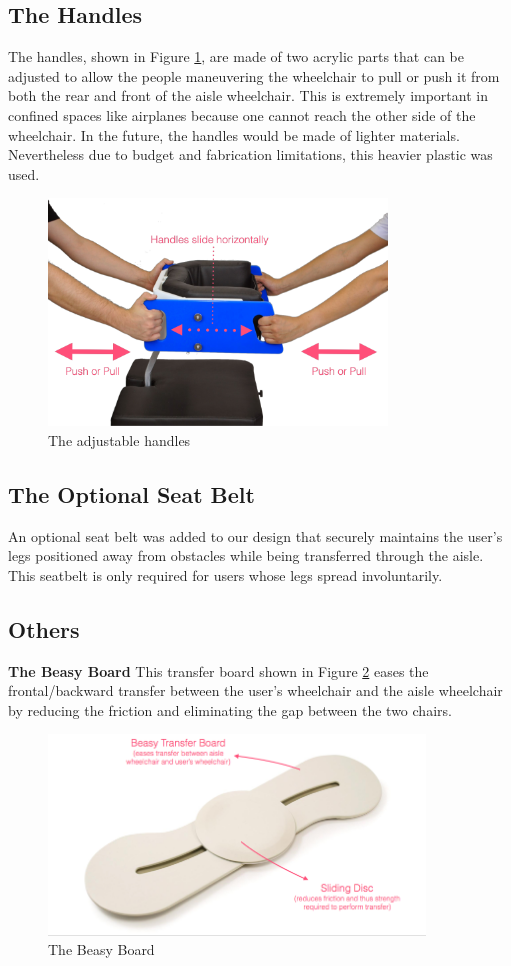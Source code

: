 \subsection{The Handles}
The handles, shown in Figure \ref{fig:handles}, are made of two acrylic parts that can be adjusted to allow the people maneuvering the wheelchair to pull or push it from both the rear and front of the aisle wheelchair. This is extremely important in confined spaces like airplanes because one cannot reach the other side of the wheelchair. In the future,  the handles would be made of  lighter materials. Nevertheless due to budget and fabrication limitations, this heavier plastic was used.


\begin{figure}[h]
\centering
\includegraphics[width=9cm]{images/AisleWheelchair7.png}
\caption{The adjustable handles}
\label{fig:handles}
\end{figure}

\subsection{The Optional Seat Belt}
An optional seat belt was added to our design that securely maintains the user's legs positioned away from obstacles while being transferred through the aisle. This seatbelt is only required for users whose legs spread involuntarily.

\subsection{Others}
\textbf{The Beasy Board}
	This transfer board shown in Figure  \ref{fig:board} eases the frontal/backward transfer between the user's wheelchair and the aisle wheelchair by reducing the friction and eliminating the gap between the two chairs.

\begin{figure}[h]
\centering
\includegraphics[width=10cm]{images/AisleWheelchair8.png}
\caption{The Beasy Board}
\label{fig:board}
\end{figure}

